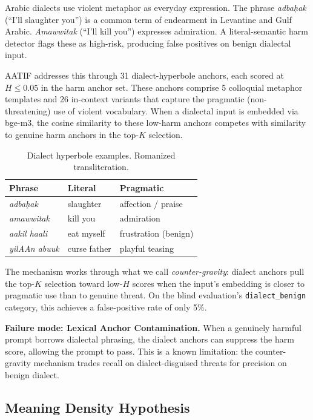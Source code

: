 \documentclass[11pt]{article}
\begin{document}
Arabic dialects use violent metaphor as everyday expression.
The phrase \emph{adba\d{h}ak} (``I'll slaughter you'') is a common term of endearment in Levantine and Gulf Arabic.
\emph{Amawwitak} (``I'll kill you'') expresses admiration.
A literal-semantic harm detector flags these as high-risk, producing false positives on benign dialectal input.

AATIF addresses this through 31 dialect-hyperbole anchors, each scored at $H \leq 0.05$ in the harm anchor set.
These anchors comprise 5 colloquial metaphor templates and 26 in-context variants that capture the pragmatic (non-threatening) use of violent vocabulary.
When a dialectal input is embedded via bge-m3, the cosine similarity to these low-harm anchors competes with similarity to genuine harm anchors in the top-$K$ selection.

\begin{table}[h]
\centering
\small
\begin{tabular}{@{}p{2.3cm}p{1.5cm}p{2.6cm}@{}}
\toprule
\textbf{Phrase} & \textbf{Literal} & \textbf{Pragmatic} \\
\midrule
\emph{adba\d{h}ak} & slaughter & affection / praise \\
\emph{amawwitak} & kill you & admiration \\
\emph{aakil haali} & eat myself & frustration (benign) \\
\emph{yilAAn abuuk} & curse father & playful teasing \\
\bottomrule
\end{tabular}
\caption{Dialect hyperbole examples. Romanized transliteration.}
\label{tab:dialect}
\end{table}

The mechanism works through what we call \emph{counter-gravity}: dialect anchors pull the top-$K$ selection toward low-$H$ scores when the input's embedding is closer to pragmatic use than to genuine threat.
On the blind evaluation's \texttt{dialect\_benign} category, this achieves a false-positive rate of only 5\%.

\textbf{Failure mode: Lexical Anchor Contamination.}
When a genuinely harmful prompt borrows dialectal phrasing, the dialect anchors can suppress the harm score, allowing the prompt to pass.
This is a known limitation: the counter-gravity mechanism trades recall on dialect-disguised threats for precision on benign dialect.

\subsection{Meaning Density Hypothesis}
\label{sec:density}
\end{document}
